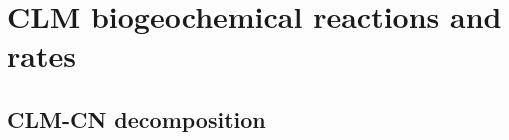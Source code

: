 \documentclass[gmd, manuscript]{copernicus}
\begin{document}
%
%
%
%
%
%
%
%
%
%
%
%
%
%
%
%
%
%

%

\appendix

\section{CLM biogeochemical reactions and rates}
\label{sec:clmbgc}
\subsection{CLM-CN decomposition}
\label{section:bgc}
\end{document}
